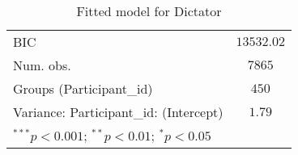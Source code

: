 \begin{table}
\begin{center}
\begin{small}
\begin{tabular}{l c}
BIC                                                   & $13532.02$              \\
Num. obs.                                             & $7865$                  \\
Groups (Participant\_id)                              & $450$                   \\
Variance: Participant\_id: (Intercept)                & $1.79$                  \\
\hline
\multicolumn{2}{l}{\tiny{$^{***}p<0.001$; $^{**}p<0.01$; $^{*}p<0.05$}}
\end{tabular}
\end{small}
\caption{Fitted model for Dictator}
\label{table:dictator-estimates}
\end{center}
\end{table}
